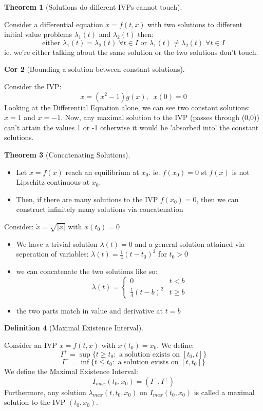 \documentclass{article}
\newtheorem{thm}{Theorem}[section]
\newtheorem{defn}[thm]{Definition}
\newtheorem{cor}[thm]{Cor}
\begin{document}
\begin{thm}[Solutions do different IVPs cannot touch]\end{thm}
Consider a differential equation $\dot x = f(t, x)$ with two solutions to different initial value problems $\lambda_1(t)$ and $\lambda_2(t)$ then:
\[\text{either }\lambda_1(t) = \lambda_2(t) \; \forall t \in I \text{ or }  \lambda_1(t) \neq \lambda_2(t) \;\forall t \in I\]
ie. we're either talking about the same solution or the two solutions don't touch.

\begin{cor}[Bounding a solution between constant solutions]\end{cor}
Consider the IVP:
\[\dot x = (x^2-1)g(x), \; \; x(0) = 0\]
Looking at the Differential Equation alone, we can see two constant solutions: $x = 1$ and $x = -1$. Now, any maximal solution to the IVP (passes through (0,0)) can't attain the values 1 or -1 otherwise it would be 'absorbed into' the constant solutions.
 
\begin{thm}[Concatenating Solutions]\end{thm}
\begin{itemize}
    \item Let $\dot x = f(x)$ reach an equilibrium at $x_0$. ie. $f(x_0) = 0$ st $f(x)$ is not Lipschitz continuous at $x_0$.
    \item Then, if there are many solutions to the IVP $f(x_0) = 0$, then we can construct infinitely many solutions via concatenation
\end{itemize}

Consider: $\dot x = \sqrt{|x|}$ with $x(t_0) = 0$

\begin{itemize}
    \item We have a trivial solution $\lambda(t) = 0$
    and a general solution attained via seperation of variables: $\lambda(t) = \frac{1}{4}(t-t_0)^2$ for $t_0 > 0$
    \item we can concatenate the two solutions like so:
    \[\lambda(t) = \begin{cases}
        0 & t < b \\
        \frac{1}{4}(t-b)^2 & t \geq b
    \end{cases}
    \]
    \item the two parts match in value and derivative at $t = b$
\end{itemize}

\begin{defn}[Maximal Existence Interval]\end{defn}
Consider an IVP $\dot x = f(t, x)$ with $x(t_0) = x_0$. We define: 
\[ I^+ = \sup\{t \geq t_0 : \text{ a solution exists on } [t_0, t]\}\]
\[ I^- = \inf\{t \leq t_0 : \text{ a solution exists on } [t, t_0]\}\]
We define the Maximal Existence Interval:
\[I_{max}(t_0, x_0) = (I^-, I^+)\]
Furthermore, any solution $\lambda_{max}(t, t_0, x_0)$ on $I_{max}(t_0, x_0)$ is called a maximal solution to the IVP $(t_0, x_0)$.
\end{document}
